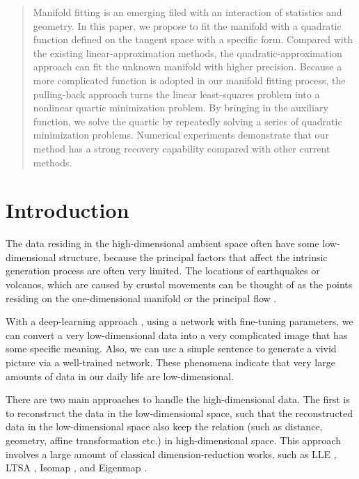 \documentclass{article}
\theoremstyle{remark}
\begin{document}
\printAffiliationsAndNotice{\icmlEqualContribution} %

\begin{abstract}

Manifold fitting is an emerging filed with an interaction of statistics and geometry. In this paper, we propose to fit the manifold with a quadratic function defined on the tangent space with a specific form. Compared with the existing linear-approximation methods, the quadratic-approximation approach can fit the unknown manifold with higher precision. Because a more complicated function is adopted in our manifold fitting process, the pulling-back approach turns the linear least-squares problem into a nonlinear quartic minimization problem. By bringing in the auxiliary function, we solve the quartic by repeatedly solving a series of quadratic minimization problems. Numerical experiments demonstrate that our method has a strong recovery capability compared with other current methods.

\end{abstract}

\section{Introduction}

The data residing in the high-dimensional ambient space often have some low-dimensional structure, because the principal factors that affect the intrinsic generation process are often very limited. The locations of earthquakes or volcanos, which are caused by crustal movements can be thought of as the points residing on the one-dimensional manifold or the principal flow \cite{panaretos2014principal,davenport2010joint}.

With a  deep-learning approach \cite{NIPS2014_5ca3e9b1}, using a network with fine-tuning parameters, we can convert a very low-dimensional data into a very complicated image that has some specific meaning. Also, we can use a simple sentence to generate a vivid picture via a well-trained network. These phenomena indicate that very large amounts of data in our daily life are low-dimensional.

 
There are two main approaches to handle the high-dimensional data. The first is to reconstruct the data in the low-dimensional space, such that the reconstructed data in the low-dimensional space also keep the relation (such as distance, geometry, affine transformation etc.) in high-dimensional space. This approach involves a large amount of classical dimension-reduction works, such as LLE \cite{roweis2000nonlinear}, LTSA \cite{zhang2004principal}, Isomap \cite{tenenbaum2000global}, and Eigenmap \cite{belkin2003laplacian}.
 
\end{document}
